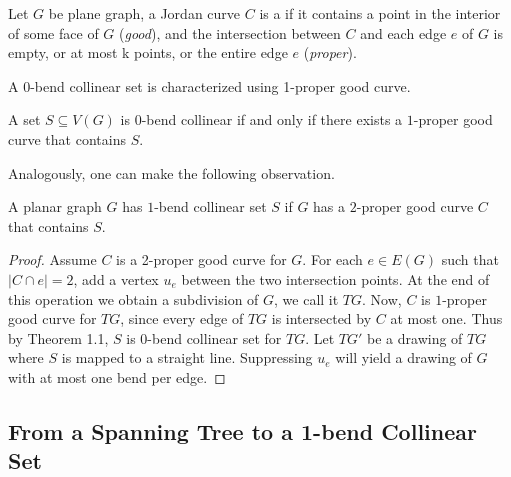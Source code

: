 Let $G$ be plane graph, a Jordan curve $C$ is a  if it contains a point in the interior of some face of $G$ (\textit{good}), and the intersection between $C$ and each edge $e$ of $G$ is empty, or at most k points, or the entire edge $e$ (\textit{proper}).

A $0$-bend collinear set is characterized using 1-proper good curve.

\begin{thm}
A set $S \subseteq V(G)$ is 0-bend collinear if and only if there exists a $1$-proper good curve that contains $S$.
\end{thm}

Analogously, one can make the following observation.
\begin{observation} {\label{new_topo}}
    A planar graph $G$ has $1$-bend collinear set $S$ if $G$ has a $2$-proper good curve $C$ that contains $S$.
\end{observation}
\begin{proof}
Assume $C$ is a 2-proper good curve for $G$. For each $e \in E(G)$ such that $|C \cap e| = 2$, add a vertex $u_e$ between the two intersection points. At the end of this operation we obtain a subdivision of $G$, we call it $TG$. Now, $C$ is $1$-proper good curve for $TG$, since every edge of $TG$ is intersected by $C$ at most one. Thus by Theorem 1.1, $S$ is 0-bend collinear set for $TG$. Let $TG'$ be a drawing of $TG$ where $S$ is mapped to a straight line. Suppressing $u_e$ will yield a drawing of $G$ with at most one bend per edge.
\end{proof}

\subsection{From a Spanning Tree to a 1-bend Collinear Set}



